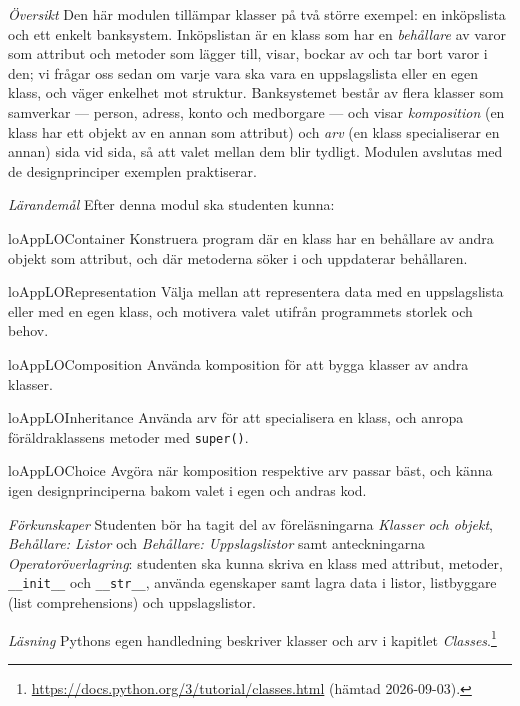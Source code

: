 \emph{Översikt}
Den här modulen tillämpar klasser på två större exempel: en inköpslista
och ett enkelt banksystem.  Inköpslistan är en klass som har en
\emph{behållare} av varor som attribut och metoder som lägger till,
visar, bockar av och tar bort varor i den; vi frågar oss sedan om varje
vara ska vara en uppslagslista eller en egen klass, och väger
enkelhet mot struktur.  Banksystemet består av flera klasser som
samverkar --- person, adress, konto och medborgare --- och visar
\emph{komposition} (en klass har ett objekt av en annan som attribut)
och \emph{arv} (en klass specialiserar en annan) sida vid sida, så att
valet mellan dem blir tydligt.  Modulen avslutas med de designprinciper
exemplen praktiserar.

\emph{Lärandemål}
Efter denna modul ska studenten kunna:
\begin{restatable}{lo}{AppLOContainer}\label{AppLOContainer}%
  Konstruera program där en klass har en behållare av andra objekt som
  attribut, och där metoderna söker i och uppdaterar behållaren.
\end{restatable}
\begin{restatable}{lo}{AppLORepresentation}\label{AppLORepresentation}%
  Välja mellan att representera data med en uppslagslista eller med en
  egen klass, och motivera valet utifrån programmets storlek och behov.
\end{restatable}
\begin{restatable}{lo}{AppLOComposition}\label{AppLOComposition}%
  Använda komposition för att bygga klasser av andra klasser.
\end{restatable}
\begin{restatable}{lo}{AppLOInheritance}\label{AppLOInheritance}%
  Använda arv för att specialisera en klass, och anropa
  föräldraklassens metoder med \texttt{super()}.
\end{restatable}
\begin{restatable}{lo}{AppLOChoice}\label{AppLOChoice}%
  Avgöra när komposition respektive arv passar bäst, och känna igen
  designprinciperna bakom valet i egen och andras kod.
\end{restatable}

\emph{Förkunskaper}
Studenten bör ha tagit del av föreläsningarna \emph{Klasser och objekt},
\emph{Behållare: Listor} och \emph{Behållare: Uppslagslistor} samt
anteckningarna \emph{Operatoröverlagring}: studenten ska kunna skriva
en klass med attribut, metoder, \texttt{__init__} och
\texttt{__str__}, använda egenskaper samt lagra data i
listor, listbyggare (\foreignlanguage{english}{list comprehensions}) och
uppslagslistor.

\emph{Läsning}
Pythons egen handledning beskriver klasser och arv i kapitlet
\emph{Classes}.\footnote{\label{fn:pydoc-classes-tillampningar}%
  \url{https://docs.python.org/3/tutorial/classes.html} (hämtad
  2026-09-03).}
